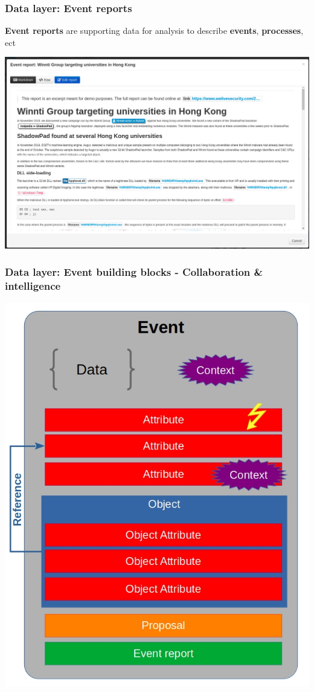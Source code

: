 \begin{frame}[fragile]
    \frametitle{Data layer: Event reports}
    {\bf Event reports} are supporting data for analysis to describe {\bf events}, {\bf processes}, ect
    \begin{center}
        \includegraphics[width=0.9\linewidth]{screenshots/event-report.png}
    \end{center}
\end{frame}

\begin{frame}
    \frametitle{Data layer: Event building blocks - Collaboration \& intelligence}
        \begin{center}
            \includegraphics[scale=0.33]{screenshots/event-building-blocks/event-attribute-object-proposal.png}
        \end{center}
\end{frame}

